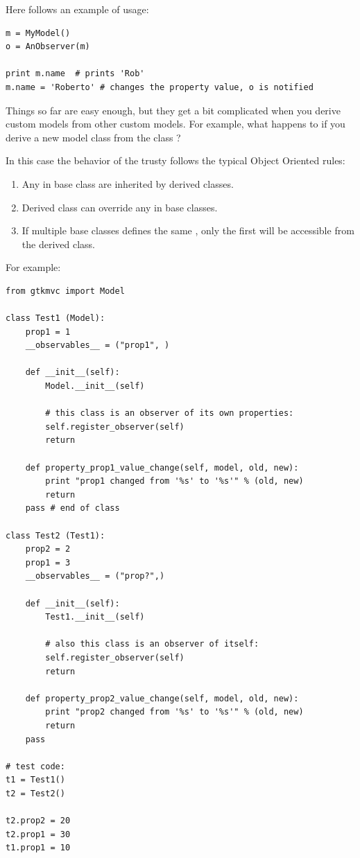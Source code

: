 Here follows an example of usage:
{ \codesize 
\begin{verbatim} 
m = MyModel()
o = AnObserver(m)

print m.name  # prints 'Rob'
m.name = 'Roberto' # changes the property value, o is notified
\end{verbatim}
}

Things so far are easy enough, but they get a bit complicated when you
derive custom models from other custom models.  For example, what
happens to \OP if you derive a new model class from the class
?

In this case the behavior of the \OP trusty follows the typical Object
Oriented rules:
\begin{enumerate}
    \item Any \OP in base class are inherited by derived classes.
    \item Derived class can override any \OP in base classes.
    \item If multiple base classes defines the same \OP, only the
      first \OP will be accessible from the derived class.
\end{enumerate}

For example:

{ \codesize
\begin{verbatim} 
from gtkmvc import Model

class Test1 (Model):
    prop1 = 1
    __observables__ = ("prop1", )

    def __init__(self):
        Model.__init__(self)

        # this class is an observer of its own properties:
        self.register_observer(self) 
        return
    
    def property_prop1_value_change(self, model, old, new):
        print "prop1 changed from '%s' to '%s'" % (old, new)
        return
    pass # end of class

class Test2 (Test1):    
    prop2 = 2
    prop1 = 3
    __observables__ = ("prop?",)
    
    def __init__(self):
        Test1.__init__(self)
        
        # also this class is an observer of itself:
        self.register_observer(self)
        return
    
    def property_prop2_value_change(self, model, old, new):
        print "prop2 changed from '%s' to '%s'" % (old, new)
        return
    pass

# test code:
t1 = Test1()
t2 = Test2()

t2.prop2 = 20
t2.prop1 = 30
t1.prop1 = 10
\end{verbatim}
}

